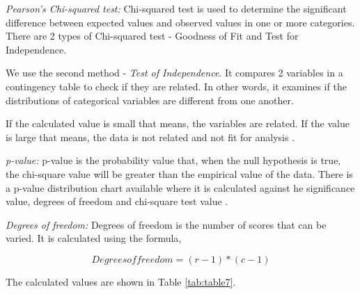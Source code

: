 \documentclass[sigconf]{acmart}
\begin{document}
\textit{Pearson's Chi-squared test:} Chi-squared test is used to determine the significant difference between expected values and observed values in one or more categories. There are 2 types of Chi-squared test - Goodness of Fit and Test for Independence. 

We use the second method - \emph{Test of Independence}. It compares 2 variables in a contingency table to check if they are related. In other words, it examines if the distributions of categorical variables are different from one another. 


If the calculated value is small that means, the variables are related. If the value is large that means, the data is not related and not fit for analysis \cite{chi-square}.

\textit{p-value:} p-value is the probability value that, when the null hypothesis is true, the chi-square value will be greater than the empirical value of the data. There is a p-value distribution chart available where it is calculated against he significance value, degrees of freedom and chi-square test value \cite{p-value}.

\textit{Degrees of freedom:} Degrees of freedom is the number of scores that can be varied. It is calculated using the formula,

\begin{equation}
Degrees of freedom = (r-1)*(c-1)
\end{equation}

The calculated values are shown in Table \ref{tab:table7}.
\end{document}
